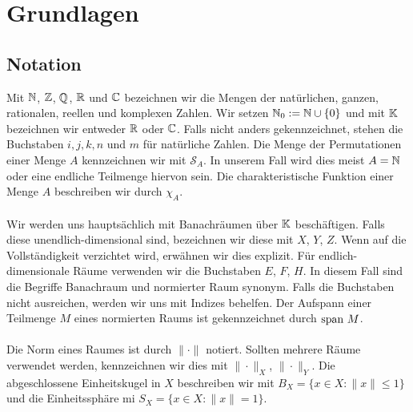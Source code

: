 

\chapter{Grundlagen}

\section{Notation}
Mit $ \mathbb{N} $, $ \mathbb{Z} $, $ \mathbb{Q} $, $ \mathbb{R} $ und $ \mathbb{C} $ bezeichnen wir die Mengen der 
natürlichen, ganzen, rationalen, reellen und komplexen Zahlen.
Wir setzen $ \mathbb{N}_0 := \mathbb{N} \cup \{0\} $ und mit $ \mathbb{K} $ bezeichnen wir entweder $ \mathbb{R} $ oder $ \mathbb{C} $. Falls nicht anders gekennzeichnet, stehen die Buchstaben $ i,j,k,n$ und  $m$ für natürliche Zahlen.
Die Menge der Permutationen einer Menge $ A $ kennzeichnen wir mit $ \mathcal{S}_A $. In unserem Fall wird dies meist $ A =  \mathbb{N} $ oder eine endliche Teilmenge hiervon sein.
Die charakteristische Funktion einer Menge $ A $ beschreiben wir durch $ \chi_A $.\\
\\ 
Wir werden uns hauptsächlich mit Banachräumen über $ \mathbb{K} $ beschäftigen.
Falls diese unendlich-dimensional sind, bezeichnen wir diese mit $ X $, $ Y $, $ Z $. Wenn auf die Vollständigkeit verzichtet wird, erwähnen wir dies explizit.
Für endlich-dimensionale Räume verwenden wir die Buchstaben $ E $, $ F $, $ H $. In diesem Fall sind die Begriffe Banachraum und normierter Raum synonym.
Falls die Buchstaben nicht ausreichen, werden wir uns mit Indizes behelfen.
Der Aufspann einer Teilmenge $ M $ eines normierten Raums ist gekennzeichnet durch $ \mathrm{span} \ M $.\\
\\
Die Norm eines Raumes ist durch $ \| \cdot \| $ notiert. 
Sollten mehrere Räume verwendet werden, kennzeichnen wir dies mit $ \| \cdot \|_X $,
$ \| \cdot \|_Y $.
Die abgeschlossene Einheitskugel in $ X $ beschreiben wir mit  $ B_X = \{ x \in X : \|x  \| \leq 1 \} $ und die Einheitssphäre mi $ S_X = \{ x \in X : \|x  \| = 1 \} $.

